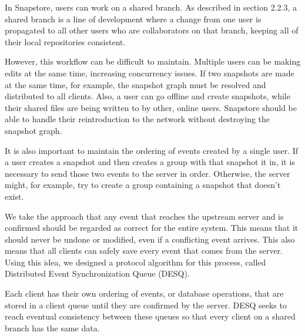 In Snapstore, users can work on a shared branch. As described in section 2.2.3, a shared branch is a line of development where a change from one user is propagated to all other users who are collaborators on that branch, keeping all of their local repositories consistent.

However, this workflow can be difficult to maintain. Multiple users can be making edits at the same time, increasing concurrency issues. If two snapshots are made at the same time, for example, the snapshot graph must be resolved and distributed to all clients. Also, a user can go offline and create snapshots, while their shared files are being written to by other, online users. Snapstore should be able to handle their reintroduction to the network without destroying the snapshot graph.

It is also important to maintain the ordering of events created by a single user. If a user creates a snapshot and then creates a group with that snapshot it in, it is necessary to send those two events to the server in order. Otherwise, the server might, for example, try to create a group containing a snapshot that doesn't exist.

We take the approach that any event that reaches the upstream server and is confirmed should be regarded as correct for the entire system. This means that it should never be undone or modified, even if a conflicting event arrives. This also means that all clients can safely save every event that comes from the server. Using this idea, we designed a protocol algorithm for this process, called Distributed Event Synchronization Queue (DESQ).

Each client has their own ordering of events, or database operations, that are stored in a client queue until they are confirmed by the server. DESQ seeks to reach eventual consistency between these queues so that every client on a shared branch has the same data.


